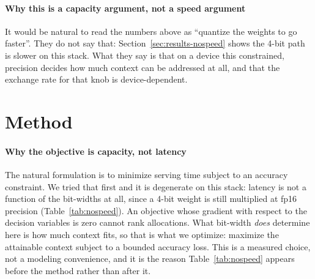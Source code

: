\documentclass[10pt,journal]{IEEEtran}
\begin{document}
\paragraph*{Why this is a capacity argument, not a speed argument}
It would be natural to read the numbers above as ``quantize the weights to go
faster''. They do not say that: Section~\ref{sec:results-nospeed} shows the
4-bit path is slower on this stack. What they say is that on a device this
constrained, precision decides how much context can be addressed at all, and
that the exchange rate for that knob is device-dependent.

\section{Method}
\label{sec:method}

\paragraph*{Why the objective is capacity, not latency}
The natural formulation is to minimize serving time subject to an accuracy
constraint. We tried that first and it is degenerate on this stack: latency is
not a function of the bit-widths at all, since a 4-bit weight is still multiplied
at fp16 precision (Table~\ref{tab:nospeed}). An objective whose gradient with
respect to the decision variables is zero cannot rank allocations. What bit-width
\emph{does} determine here is how much context fits, so that is what we optimize:
maximize the attainable context subject to a bounded accuracy loss. This is a
measured choice, not a modeling convenience, and it is the reason
Table~\ref{tab:nospeed} appears before the method rather than after it.
\end{document}
